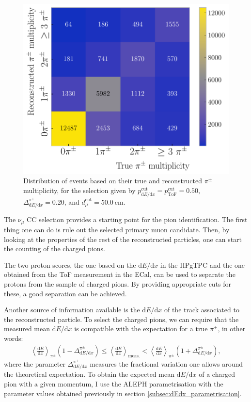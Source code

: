 \begin{figure}[t]
    \centering
    \includegraphics[width=.75\linewidth]{Images/GAr_selection/pion_selection_confusion_matrix.pdf}
    \caption[Distribution of events based on their true and reconstructed $\pi^{\pm}$ multiplicity, for a given selection.]{Distribution of events based on their true and reconstructed $\pi^{\pm}$ multiplicity, for the selection given by $p^{\mathrm{cut}}_{\mathrm{d}E/\mathrm{d}x} = p^{\mathrm{cut}}_{\mathrm{ToF}} = 0.50$, $\Delta^{\pi^{\pm}}_{\mathrm{d}E/\mathrm{d}x} = 0.20$, and $d^{\mathrm{cut}}_{\mu} = 50.0~\mathrm{cm}$.}
    \label{fig:pion_multiplicity_example}
\end{figure}

The $\nu_{\mu}$ CC selection provides a starting point for the pion identification. The first thing one can do is rule out the selected primary muon candidate. Then, by looking at the properties of the rest of the reconstructed particles, one can start the counting of the charged pions.

The two proton scores, the one based on the $\mathrm{d}E/\mathrm{d}x$ in the HPgTPC and the one obtained from the ToF measurement in the ECal, can be used to separate the protons from the sample of charged pions. By providing appropriate cuts for these, a good separation can be achieved.

Another source of information available is the $\mathrm{d}E/\mathrm{d}x$ of the track associated to the reconstructed particle. To select the charged pions, we can require that the measured mean $\mathrm{d}E/\mathrm{d}x$ is compatible with the expectation for a true $\pi^{\pm}$, in other words:
\begin{eqnarray}
    \left<\frac{\mathrm{d}E}{\mathrm{d}x}\right>_{\pi^{\pm}} \left(1 - \Delta_{\mathrm{d}E/\mathrm{d}x}^{\pi^{\pm}}\right) \leq \left<\frac{\mathrm{d}E}{\mathrm{d}x}\right>_{\mathrm{meas.}} < \left<\frac{\mathrm{d}E}{\mathrm{d}x}\right>_{\pi^{\pm}} \left(1 + \Delta_{\mathrm{d}E/\mathrm{d}x}^{\pi^{\pm}}\right),
\end{eqnarray}
where the parameter $\Delta_{\mathrm{d}E/\mathrm{d}x}^{\pi^{\pm}}$ measures the fractional variation one allows around the theoretical expectation. To obtain the expected mean $\mathrm{d}E/\mathrm{d}x$ of a charged pion with a given momentum, I use the ALEPH parametrisation with the parameter values obtained previously in section \ref{subsec:dEdx_parametrisation}.

